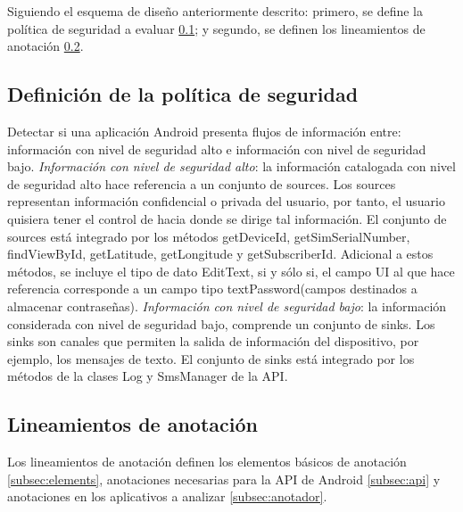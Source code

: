 Siguiendo el esquema de diseño anteriormente descrito: primero, se define la
política de seguridad a evaluar \ref{sub:politica}; y segundo, se definen los
lineamientos de anotación \ref{sub:lineamientos}.

\subsection{Definición de la política de seguridad}
\label{sub:politica}
Detectar si una aplicación Android presenta flujos de información entre:
información con nivel de seguridad alto e información con nivel de seguridad bajo.\newline
\textit{Información con nivel de seguridad alto}: la información
catalogada con nivel de seguridad alto hace referencia a un conjunto de sources.
Los sources representan información confidencial o privada del usuario, por
tanto, el usuario quisiera tener el control de hacia donde se dirige tal
información.
El conjunto de sources está integrado por los métodos getDeviceId,
getSimSerialNumber, findViewById, getLatitude, getLongitude y getSubscriberId.
Adicional a estos métodos, se incluye el tipo de dato EditText, si y sólo si, el
campo UI al que hace referencia corresponde a un campo tipo textPassword(campos
destinados a almacenar contraseñas).\newline 
\textit{Información con nivel de seguridad bajo}: la
información considerada con nivel de seguridad bajo, comprende un conjunto
de sinks. Los sinks son canales que permiten la salida de información del
dispositivo, por ejemplo, los mensajes de texto. El conjunto de sinks
está integrado por los métodos de la clases Log y SmsManager de la API.

\subsection{Lineamientos de anotación}
\label{sub:lineamientos}
Los lineamientos de anotación definen los elementos básicos de anotación
\ref{subsec:elements}, anotaciones necesarias para la API de Android
\ref{subsec:api} y anotaciones en los aplicativos a analizar \ref{subsec:anotador}.

